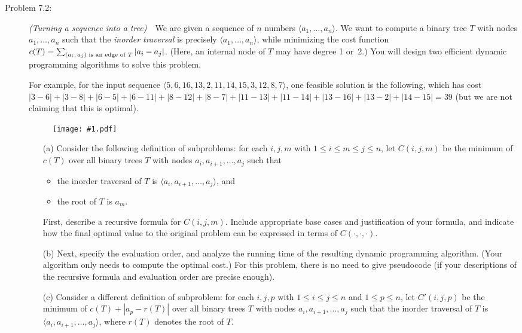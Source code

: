 \documentclass[11pt]{article}
\newcommand{\fig}[2]{\begin{figure}[h]\begin{center}%
  \texttt{[image: \#1.pdf]}\end{center}%
  \end{figure}}
\begin{document}
\begin{description}
\newpage
\item[Problem 7.2:] 
\emph{(Turning a sequence into a tree)}\ \ 
We are given a sequence of $n$ numbers $\langle a_1,\ldots,a_n\rangle$.
We want to compute a binary tree $T$ with nodes $a_1,\ldots,a_n$ such that the \emph{inorder
traversal} is precisely $\langle a_1,\ldots,a_n\rangle$, while minimizing
the cost function $c(T)=\sum_{\mbox{\scriptsize $(a_i,a_j)$ is an edge of $T$}} |a_i-a_j|$.
(Here, an internal node of $T$ may have degree 1 or~2.)
You will design two efficient dynamic programming algorithms to solve this problem.

For example, for the input sequence $\langle 5,6,16,13,2,11,14,15,3,12,8,7\rangle$,
one feasible solution is the following, which has cost $|3-6|+|3-8|+|6-5|+|6-11|+|8-12|+|8-7|+|11-13|+|11-14|+|13-16|+|13-2|+|14-15|= 39$ (but we are not claiming that this is optimal).

\fig{hw7fig2}{0.8}

\vspace{-2ex}
\begin{enumerate}
\item[(a)]
Consider the following definition of subproblems: for each $i,j,m$ with $1\le i\le m\le j\le n$,
let $C(i,j,m)$ be the minimum of $c(T)$ over all binary trees $T$ with nodes $a_i,a_{i+1},\ldots,a_j$ such that 
\begin{itemize}
\item the inorder traversal of $T$ is $\langle a_i,a_{i+1},\ldots,a_j\rangle$, and
\item the root of $T$ is $a_m$.
\end{itemize}

First, describe a recursive formula for $C(i,j,m)$.
Include appropriate base cases and justification of your formula, and indicate how the final optimal value to the original problem can be expressed in terms of $C(\cdot,\cdot,\cdot)$.

\smallskip
\item[(b)]
Next, specify the evaluation order, and analyze the running time of the resulting dynamic programming algorithm.
(Your algorithm only needs to compute the optimal cost.)
For this problem, there is no need to give pseudocode (if your descriptions of the recursive formula and evaluation order are 
precise enough).

\smallskip
\item[(c)]
Consider a different definition of subproblem:
for each $i,j,p$ with $1\le i\le j\le n$ and $1\le p\le n$,
let $C'(i,j,p)$ be the minimum of $c(T)+|a_p-r(T)|$ over all binary trees $T$ with nodes $a_i,a_{i+1},\ldots,a_j$ such that the inorder traversal of $T$ is $\langle a_i,a_{i+1},\ldots,a_j\rangle$, where $r(T)$ denotes the root of $T$.


\end{enumerate}
\end{description}
\end{document}
